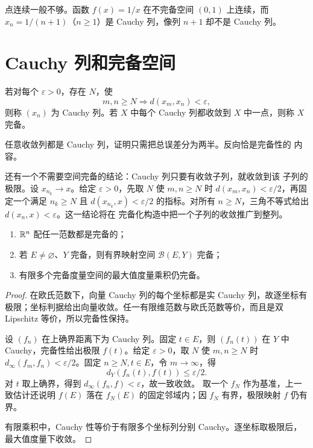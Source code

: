 点连续一般不够。函数 \(f(x)=1/x\) 在不完备空间 \((0,1)\) 上连续，而
\(x_n=1/(n+1)\)（\(n\ge1\)）是 Cauchy 列，像列 \(n+1\) 却不是 Cauchy 列。

\section{Cauchy 列和完备空间}

\begin{definition}
若对每个 \(\varepsilon>0\)，存在 \(N\)，使
\[
 m,n\ge N\Longrightarrow d(x_m,x_n)<\varepsilon,
\]
则称 \((x_n)\) 为 Cauchy 列。若 \(X\) 中每个 Cauchy 列都收敛到
\(X\) 中一点，则称 \(X\) 完备。
\end{definition}

任意收敛列都是 Cauchy 列，证明只需把总误差分为两半。反向恰是完备性的
内容。

还有一个不需要空间完备的结论：Cauchy 列只要有收敛子列，就收敛到该
子列的极限。设 \(x_{n_k}\to x\)。给定 \(\varepsilon>0\)，先取 \(N\)
使 \(m,n\ge N\) 时 \(d(x_m,x_n)<\varepsilon/2\)，再固定一个满足
\(n_k\ge N\) 且 \(d(x_{n_k},x)<\varepsilon/2\) 的指标。对所有
\(n\ge N\)，三角不等式给出 \(d(x_n,x)<\varepsilon\)。这一结论将在
完备化构造中把一个子列的收敛推广到整列。

\begin{theorem}[基本完备空间]
\label{thm:basic-complete-metric-spaces}
\begin{enumerate}[label=\textup{(\roman*)}]
 \item \(\mathbb{R}^n\) 配任一范数都是完备的；
 \item 若 \(E\ne\varnothing\)、\(Y\) 完备，则有界映射空间
 \(\mathcal B(E,Y)\) 完备；
 \item 有限多个完备度量空间的最大值度量乘积仍完备。
\end{enumerate}
\end{theorem}

\begin{proof}
在欧氏范数下，向量 Cauchy 列的每个坐标都是实 Cauchy 列，故逐坐标有
极限；坐标判据给出向量收敛。任一有限维范数与欧氏范数等价，而且是双
Lipschitz 等价，所以完备性保持。

设 \((f_n)\) 在上确界距离下为 Cauchy 列。固定 \(t\in E\)，则
\((f_n(t))\) 在 \(Y\) 中 Cauchy，完备性给出极限 \(f(t)\)。给定
\(\varepsilon>0\)，取 \(N\) 使 \(m,n\ge N\) 时
\(d_\infty(f_m,f_n)<\varepsilon/2\)。固定 \(n\ge N,t\in E\)，令
\(m\to\infty\)，得
\[
 d_Y(f_n(t),f(t))\le\varepsilon/2.
\]
对 \(t\) 取上确界，得到 \(d_\infty(f_n,f)<\varepsilon\)，故一致收敛。
取一个 \(f_N\) 作为基准，上一致估计还说明 \(f(E)\) 落在
\(f_N(E)\) 的固定邻域内；因 \(f_N\) 有界，极限映射 \(f\) 仍有界。

有限乘积中，Cauchy 性等价于有限多个坐标列分别 Cauchy。逐坐标取极限后，
最大值度量下收敛。
\end{proof}

